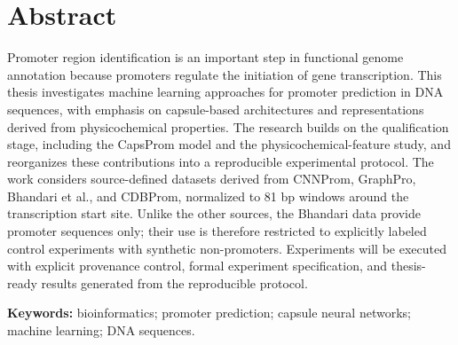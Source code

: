 \chapter*{Abstract}

Promoter region identification is an important step in functional genome
annotation because promoters regulate the initiation of gene transcription. This
thesis investigates machine learning approaches for promoter prediction in DNA
sequences, with emphasis on capsule-based architectures and representations
derived from physicochemical properties. The research builds on the qualification
stage, including the CapsProm model and the physicochemical-feature study, and
reorganizes these contributions into a reproducible experimental protocol. The
work considers source-defined datasets derived from CNNProm, GraphPro, Bhandari et
al., and CDBProm, normalized to 81 bp windows around the transcription start
site. Unlike the other sources, the Bhandari data provide promoter sequences
only; their use is therefore restricted to explicitly labeled control
experiments with synthetic non-promoters. Experiments will be executed with
explicit provenance control, formal experiment specification, and thesis-ready
results generated from the reproducible protocol.

\noindent \textbf{Keywords:} bioinformatics; promoter prediction; capsule neural
networks; machine learning; DNA sequences.
